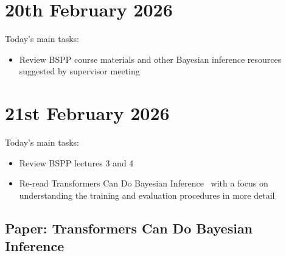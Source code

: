 \documentclass[12pt,a4paper,twoside]{article}
\begin{document}
\section{20th February 2026}
\begin{summary}	
	Today's main tasks:
	\begin{itemize}[leftmargin=*]
		\item Review BSPP course materials and other Bayesian inference resources suggested by supervisor meeting
	\end{itemize}
\end{summary}

\section{21st February 2026}
\begin{summary}
	Today's main tasks:
	\begin{itemize}[leftmargin=*]
		\item Review BSPP lectures 3 and 4
		\item Re-read Transformers Can Do Bayesian Inference~\cite{Mller2022} with a focus on understanding the training and evaluation procedures in more detail
	\end{itemize}
\end{summary}

\subsection{Paper: Transformers Can Do Bayesian Inference}
\end{document}
